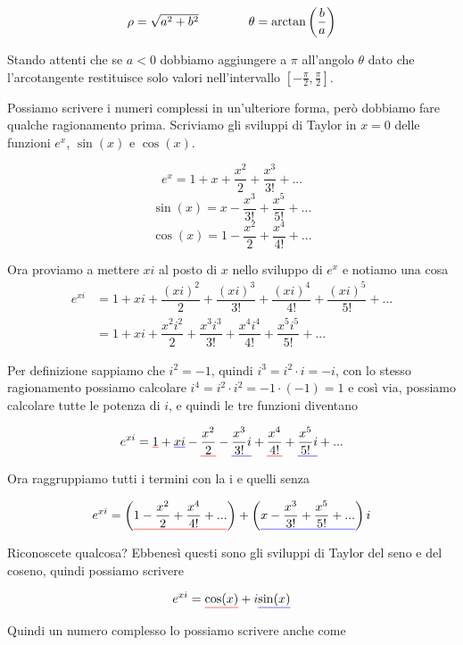 \documentclass{rapport}
\def\mathunderline#1#2{\color{#1}\underline{{\color{black}#2}}\color{black}}
\begin{document}
\[
\begin{array}{c@{\qquad}@{\qquad}c}
  \rho = \sqrt{a^2+b^2} & \theta = \arctan\left(\dfrac{b}{a}\right)
\end{array}
\]

Stando attenti che se $a<0$ dobbiamo aggiungere a $\pi$ all'angolo $\theta$ dato che l'arcotangente restituisce solo valori nell'intervallo $[-\frac{\pi}{2}, \frac{\pi}{2}]$.


Possiamo scrivere i numeri complessi in un'ulteriore forma, però dobbiamo fare qualche ragionamento prima. Scriviamo gli sviluppi di Taylor in $x=0$ delle funzioni $e^x$, $\sin(x)$ e $\cos(x)$.

\[
e^{x} = 1 + x+ \dfrac{x^2}{2} + \dfrac{x^3}{3!} + ...
\]
\[
\sin(x) = x - \dfrac{x^3}{3!} + \dfrac{x^5}{5!}+...
\]
\[
\cos(x) = 1 - \dfrac{x^2}{2} + \dfrac{x^4}{4!} + ...
\]

Ora proviamo a mettere $xi$ al posto di $x$ nello sviluppo di $e^x$ e notiamo una cosa
\begin{align*}
e^{xi} &= 1 + xi+ \dfrac{(xi)^2}{2} + \dfrac{(xi)^3}{3!} + \dfrac{(xi)^4}{4!}+ \dfrac{(xi)^5}{5!}+ ...  \\
&= 1 + xi+ \dfrac{x^2i^2}{2} + \dfrac{x^3i^3}{3!} + \dfrac{x^4i^4}{4!}+ \dfrac{x^5i^5}{5!} +...
\end{align*}


Per definizione sappiamo che $i^2=-1$, quindi $i^3 = i^2\cdot i = -i$, con lo stesso ragionamento possiamo calcolare $i^4 = i^2\cdot i^2 = -1\cdot (-1) = 1$ e così via, possiamo calcolare tutte le potenza di $i$, e quindi le tre funzioni diventano

\[
e^{xi} = \mathunderline{red}{1} + \mathunderline{blue}{xi} - \mathunderline{red}{\dfrac{x^2}{2}} - \mathunderline{blue}{\dfrac{x^3}{3!}i} + \mathunderline{red}{\dfrac{x^4}{4!}}+ \mathunderline{blue}{\dfrac{x^5}{5!}i} +...
\]

Ora raggruppiamo tutti i termini con la i e quelli senza

\[
e^{xi} = \left(\mathunderline{red}{1 - \dfrac{x^2}{2} + \dfrac{x^4}{4!}+...}\right) +\left(\mathunderline{blue}{x- \dfrac{x^3}{3!} +\dfrac{x^5}{5!} +...}\right) i
\]

Riconoscete qualcosa? Ebbenesì questi sono gli sviluppi di Taylor del seno e del coseno, quindi possiamo scrivere 

\[
e^{xi} = \mathunderline{red}{\cos(x)} + i\mathunderline{blue}{\sin(x)}
\]

Quindi un numero complesso lo possiamo scrivere anche come
\end{document}
